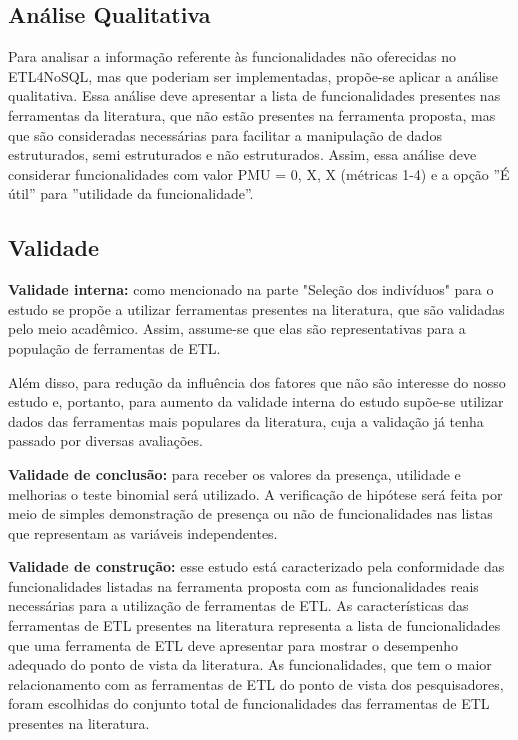 \subsection{Análise Qualitativa}

Para analisar a informação referente às funcionalidades não oferecidas no ETL4NoSQL, mas que poderiam ser implementadas, propõe-se aplicar a análise qualitativa. Essa análise deve apresentar a lista de funcionalidades presentes nas ferramentas da literatura, que não estão presentes na ferramenta proposta, mas que são consideradas necessárias para facilitar a manipulação de dados estruturados, semi estruturados e não estruturados.
Assim, essa análise deve considerar funcionalidades com valor PMU = {0, X, X} (métricas 1-4) e a opção ''É útil'' para ''utilidade da funcionalidade''.

\subsection{Validade}

\textbf{Validade interna:} como mencionado na parte "Seleção dos indivíduos" para o estudo se propõe a utilizar ferramentas presentes na literatura, que são validadas pelo meio acadêmico. Assim, assume-se que elas são representativas para a população de ferramentas de ETL.

Além disso, para redução da influência dos fatores que não são interesse do nosso estudo e, portanto, para aumento da validade interna do estudo supõe-se utilizar dados das ferramentas mais populares da literatura, cuja a validação já tenha passado por diversas avaliações.

\textbf{Validade de conclusão:} para receber os valores da presença, utilidade e melhorias o teste binomial será utilizado. A verificação de hipótese será feita por meio de simples demonstração de presença ou não de funcionalidades nas listas que representam as variáveis independentes.

\textbf{Validade de construção:} esse estudo está caracterizado pela conformidade das funcionalidades listadas na ferramenta proposta com as funcionalidades reais necessárias para a utilização de ferramentas de ETL. As características das ferramentas de ETL presentes na literatura representa a lista de funcionalidades que uma ferramenta de ETL deve apresentar para mostrar o desempenho adequado do ponto de vista da literatura. As funcionalidades, que tem o maior relacionamento com as ferramentas de ETL do ponto de vista dos pesquisadores, foram escolhidas do conjunto total de funcionalidades das ferramentas de ETL presentes na literatura.

